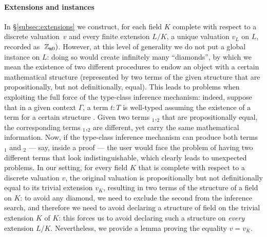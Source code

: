 \documentclass[sigplan,screen]{acmart}
\begin{document}
\paragraph{Extensions and  instances}
In \S\ref{subsec:extensions} we construct, for each field $K$ complete with respect to a discrete valuation~$v$ and every finite extension $L/K$, a unique valuation $v_L$ on $L$, recorded as $\;\mathbb{Z}_{\mathtt{m}0})$. However, at this level of generality we do not put a global  instance on $L$: doing so would create infinitely many ``diamonds'', by which we mean the existence of two different procedures to endow an object with a certain mathematical structure (represented by two terms of the given structure that are propositionally, but not definitionally, equal). This leads to problems when exploiting the full force of the type-class inference mechanism: indeed, suppose that in a given context $\Gamma$, a term $t:T$ is well-typed assuming the existence of a term  for a certain structure . Given two terms $_1$,$_2$ that are propositionally equal, the corresponding terms $_1$,$_2$ are different, yet carry the same mathematical information. Now, if the type-class inference mechanism can produce both terms $_1$ and $_2$ --- say, inside a proof --- the user would face the problem of having two different terms that look indistinguishable, which clearly leads to unexpected problems. In our setting, for every field $K$ that is complete with respect to a discrete valuation $v$, the original valuation is propositionally but not definitionally equal to its trivial extension $v_K$, resulting in two terms of the structure of a  field on $K$: to avoid any diamond, we need to exclude the second from the inference search, and therefore we need to avoid declaring a structure of  field on the trivial extension $K$ of $K$: this forces us to avoid declaring such a structure on \emph{every} extension $L/K$. Nevertheless, we provide a lemma \href{https://github.com/mariainesdff/local_fields_journal/blob/0b408ff3af36e18f991f9d4cb87be3603cfc3fc3/src/discrete_valuation_ring/trivial_extension.lean#L63}{\extlink} proving the equality $v=v_K$.
\end{document}
